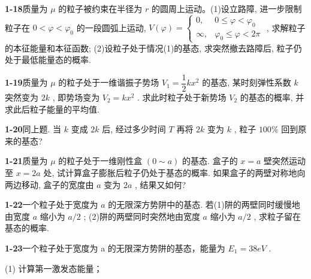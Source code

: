 \vfill

\newpage

\textbf{1-18}\quad 质量为 $\displaystyle \mu$ 的粒子被约束在半径为 $\displaystyle r$ 的圆周上运动。(1)设立路障, 进一步限制粒子在 $\displaystyle 0 < \varphi < \varphi_0$ 的一段圆弧上运动, $\displaystyle V(\varphi) = \begin{cases} 0, & 0 \leqslant \varphi < \varphi_0 \\ \infty, & \varphi_0 \leqslant \varphi < 2\pi \end{cases}$ , 求解粒子的本征能量和本征函数; (2)设粒子处于情况(1)的基态, 求突然撤去路障后, 粒子仍处于最低能量态的概率.

\vfill

\newpage

\textbf{1-19}\quad 质量为 $\displaystyle \mu$ 的粒子处于一维谐振子势场 $\displaystyle V_{1} = \dfrac{1}{2} kx^{2}$ 的基态, 某时刻弹性系数 $\displaystyle k$ 突然变为 $\displaystyle 2k$ , 即势场变为 $\displaystyle V_{2} = kx^{2}$ . 求此时粒子处于新势场 $\displaystyle V_{2}$ 的基态的概率, 并求此后粒子能量的平均值.

\vfill

\newpage

\textbf{1-20}\quad 同上题. 当 $\displaystyle k$ 变成 $\displaystyle 2k$ 后, 经过多少时间 $\displaystyle T$ 再将 $\displaystyle 2k$ 变为 $\displaystyle k$ , 粒子 $\displaystyle 100\%$ 回到原来的基态?

\vfill

\newpage

\textbf{1-21}\quad 质量为 $\displaystyle \mu$ 的粒子处于一维刚性盒 $\displaystyle (0 \sim a)$ 的基态. 盒子的 $\displaystyle x = a$ 壁突然运动至 $\displaystyle x = 2a$ 处, 试计算盒子膨胀后粒子仍处于基态的概率. 如果盒子的两壁对称地向两边移动, 盒子的宽度由 $\displaystyle a$ 变为 $\displaystyle 2a$ , 结果又如何?

\vfill

\newpage

\textbf{1-22}\quad 一个粒子处于宽度为 $\displaystyle a$ 的无限深方势阱中的基态. 若(1)阱的两壁同时缓慢地由宽度 $\displaystyle a$ 缩小为 $\displaystyle a / 2$ ; (2)阱的两壁同时突然地由宽度 $\displaystyle a$ 缩小为 $\displaystyle a / 2$ , 求粒子留在基态的概率.

\vfill

\newpage

\textbf{1-23}\quad 一个粒子处于宽度为 a 的无限深方势阱的基态，能量为 $\displaystyle E_{1}=38eV$ .

(1) 计算第一激发态能量；

